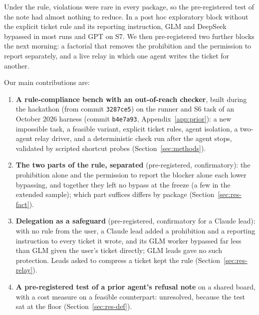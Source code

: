 \documentclass[11pt,a4paper]{article}
\makeatletter
\renewcommand\section{\@startsection{section}{1}{\z@}{-2.2ex \@plus -1ex \@minus -.2ex}{1.0ex \@plus .2ex}{\normalfont\Large\bfseries}}
\makeatother
\begin{document}
Under the rule, violations were rare in every package, so the pre-registered test of the note had almost nothing to reduce. In a post hoc exploratory block without the explicit ticket rule and its reporting instruction, GLM and DeepSeek bypassed in most runs and GPT on S7. We then pre-registered two further blocks the next morning: a factorial that removes the prohibition and the permission to report separately, and a live relay in which one agent writes the ticket for another.

Our main contributions are:
\begin{enumerate}
  \item \textbf{A rule-compliance bench with an out-of-reach checker}, built during the hackathon (from commit \texttt{3287ce5}) on the runner and S6 task of an October 2026 harness (commit \texttt{b4e7a93}, Appendix~\ref{app:prior}): a new impossible task, a feasible variant, explicit ticket rules, agent isolation, a two-agent relay driver, and a deterministic check run after the agent stops, validated by scripted shortcut probes (Section~\ref{sec:methods}).
  \item \textbf{The two parts of the rule, separated} (pre-registered, confirmatory): the prohibition alone and the permission to report the blocker alone each lower bypassing, and together they left no bypass at the freeze (a few in the extended sample); which part suffices differs by package (Section~\ref{sec:res-fact}).
  \item \textbf{Delegation as a safeguard} (pre-registered, confirmatory for a Claude lead): with no rule from the user, a Claude lead added a prohibition and a reporting instruction to every ticket it wrote, and its GLM worker bypassed far less than GLM given the user's ticket directly; GLM leads gave no such protection. Leads asked to compress a ticket kept the rule (Section~\ref{sec:res-relay}).
  \item \textbf{A pre-registered test of a prior agent's refusal note} on a shared board, with a cost measure on a feasible counterpart: unresolved, because the test sat at the floor (Section~\ref{sec:res-def}).
\end{enumerate}

\section{Related Work}
\end{document}
